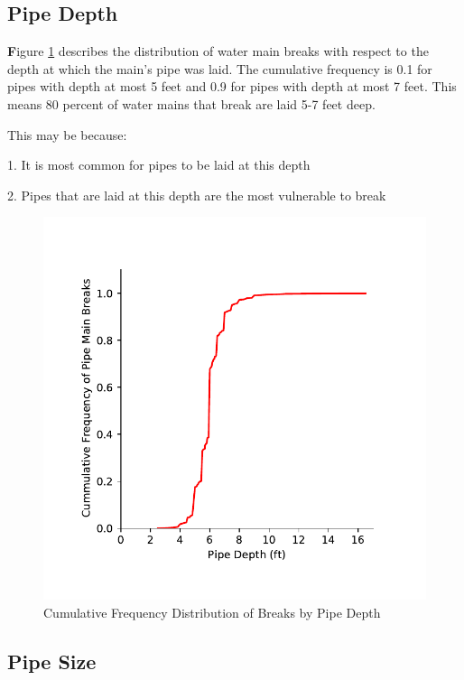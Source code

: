 \documentclass[twocolumn]{article}
\begin{document}
\subsection{Pipe Depth}

\textbf Figure \ref{fig:Pipe Depth} describes the distribution of water main breaks with respect to the depth at which the main's pipe was laid. The cumulative frequency is 0.1 for pipes with depth at most 5 feet and 0.9 for pipes with depth at most 7 feet. This means 80 percent of water mains that break are laid 5-7 feet deep.

This may be because:

1.	It is most common for pipes to be laid at this depth

2.	Pipes that are laid at this depth are the most vulnerable to break

\begin{figure}[H]
    \includegraphics[width=\columnwidth]{Gautam/depth_cdf.pdf}
    \caption{Cumulative Frequency Distribution of Breaks by Pipe Depth}
    \label{fig:Pipe Depth}
\end{figure}


\subsection{Pipe Size}
\end{document}

